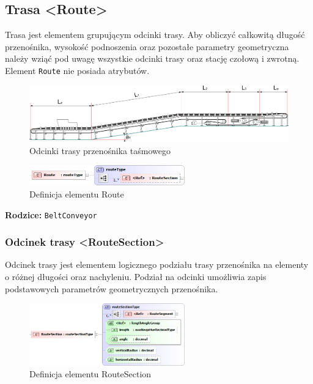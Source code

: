 \documentclass[12pt,a4paper]{article}
\begin{document}
\subsection{Trasa <Route>}\label{sec:Route}
Trasa jest elementem grupującym odcinki trasy. Aby obliczyć całkowitą długość
przenośnika, wysokość podnoszenia oraz pozostałe parametry geometryczna należy
wziąć pod uwagę wszystkie odcinki trasy oraz stację czołową i zwrotną.  Element
{\tt Route} nie posiada atrybutów.

\begin{figure}
  \centering
  \includegraphics[width=\textwidth]{png/belt_conveyor2_drw}
  \caption{Odcinki trasy przenośnika taśmowego}
  \label{fig:beltConveyor2-drw}
\end{figure}

\begin{figure}[H]
  \centering
  \includegraphics[width=0.6\textwidth]{png/liquid/Route}
  \caption{Definicja elementu Route}
  \label{fig:route-xsd}
\end{figure}

\noindent\textbf{Rodzice:} \texttt{BeltConveyor}


\subsubsection{Odcinek trasy <RouteSection>}
Odcinek trasy jest elementem logicznego podziału trasy przenośnika na elementy o
różnej długości oraz nachyleniu. Podział na odcinki umożliwia zapis podstawowych
parametrów geometrycznych przenośnika.

\begin{figure}[H]
  \centering
  \includegraphics[width=0.6\textwidth]{png/liquid/RouteSection}
  \caption{Definicja elementu RouteSection}
  \label{fig:routeSection-xsd}
\end{figure}
\end{document}
